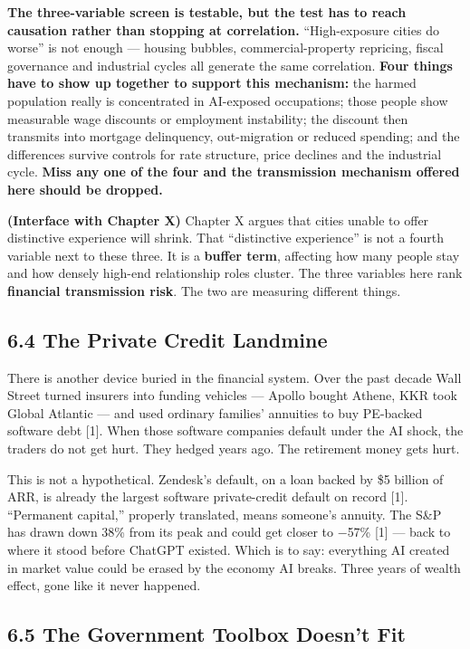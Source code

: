 \documentclass[11pt,a4paper]{article}
\begin{document}
\textbf{The three-variable screen is testable, but the test has to reach causation rather than stopping at correlation.} ``High-exposure cities do worse'' is not enough --- housing bubbles, commercial-property repricing, fiscal governance and industrial cycles all generate the same correlation. \textbf{Four things have to show up together to support this mechanism:} the harmed population really is concentrated in AI-exposed occupations; those people show measurable wage discounts or employment instability; the discount then transmits into mortgage delinquency, out-migration or reduced spending; and the differences survive controls for rate structure, price declines and the industrial cycle. \textbf{Miss any one of the four and the transmission mechanism offered here should be dropped.}

\textbf{(Interface with Chapter X)} Chapter X argues that cities unable to offer distinctive experience will shrink. That ``distinctive experience'' is not a fourth variable next to these three. It is a \textbf{buffer term}, affecting how many people stay and how densely high-end relationship roles cluster. The three variables here rank \textbf{financial transmission risk}. The two are measuring different things.

\subsection{6.4 The Private Credit Landmine}

There is another device buried in the financial system. Over the past decade Wall Street turned insurers into funding vehicles --- Apollo bought Athene, KKR took Global Atlantic --- and used ordinary families' annuities to buy PE-backed software debt [1]. When those software companies default under the AI shock, the traders do not get hurt. They hedged years ago. The retirement money gets hurt.

This is not a hypothetical. Zendesk's default, on a loan backed by \$5 billion of ARR, is already the largest software private-credit default on record [1]. ``Permanent capital,'' properly translated, means someone's annuity. The S\&P has drawn down 38\% from its peak and could get closer to $-$57\% [1] --- back to where it stood before ChatGPT existed. Which is to say: everything AI created in market value could be erased by the economy AI breaks. Three years of wealth effect, gone like it never happened.

\subsection{6.5 The Government Toolbox Doesn't Fit}
\end{document}
